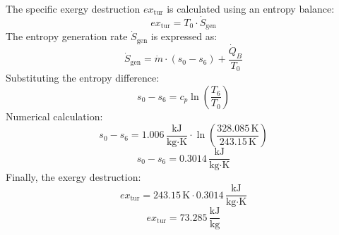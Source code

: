 The specific exergy destruction \( ex_{\text{tur}} \) is calculated using an entropy balance:  
\[
ex_{\text{tur}} = T_0 \cdot \dot{S}_{\text{gen}}
\]  
The entropy generation rate \( \dot{S}_{\text{gen}} \) is expressed as:  
\[
\dot{S}_{\text{gen}} = \dot{m} \cdot (s_0 - s_6) + \frac{\dot{Q}_B}{T_0}
\]  
Substituting the entropy difference:  
\[
s_0 - s_6 = c_p \ln \left( \frac{T_6}{T_0} \right)
\]  
Numerical calculation:  
\[
s_0 - s_6 = 1.006 \, \frac{\text{kJ}}{\text{kg·K}} \cdot \ln \left( \frac{328.085 \, \text{K}}{243.15 \, \text{K}} \right)
\]  
\[
s_0 - s_6 = 0.3014 \, \frac{\text{kJ}}{\text{kg·K}}
\]  
Finally, the exergy destruction:  
\[
ex_{\text{tur}} = 243.15 \, \text{K} \cdot 0.3014 \, \frac{\text{kJ}}{\text{kg·K}}
\]  
\[
ex_{\text{tur}} = 73.285 \, \frac{\text{kJ}}{\text{kg}}
\]